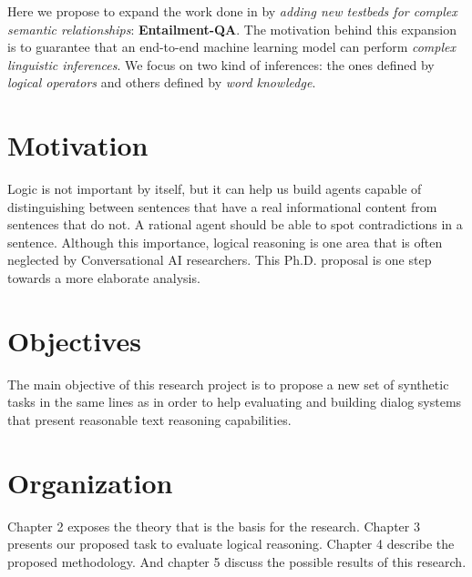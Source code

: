 Here we propose to expand the work done in \cite{BordesW16, WestonBCM15} by \textit{adding new testbeds for complex semantic relationships}: \textbf{Entailment-QA}. The motivation behind this expansion is to guarantee that an end-to-end machine learning model can perform \textit{complex linguistic inferences}. We focus on two kind of inferences: the ones defined by \textit{logical operators} and others defined by \textit{word knowledge}.


\section{Motivation}
\label{sec:motivation}

Logic is not important by itself, but it can help us build agents capable of distinguishing between sentences that have a real informational content from sentences that do not. A rational agent should be able to spot contradictions in a sentence. Although this importance, logical reasoning is one area that is often neglected by Conversational AI researchers. This Ph.D. proposal is one step towards a more elaborate analysis.


\section{Objectives}
\label{sec:objectives}

The main objective of this research project is to propose a new set of synthetic tasks in the same lines as \cite{WestonBCM15} in order to help evaluating and building dialog systems that present reasonable text reasoning capabilities.


\section{Organization}
\label{sec:organization}

Chapter 2 exposes the theory that is the basis for the research. Chapter 3 presents our proposed task to evaluate logical reasoning. Chapter 4 describe the proposed methodology. And chapter 5 discuss the possible results of this research.